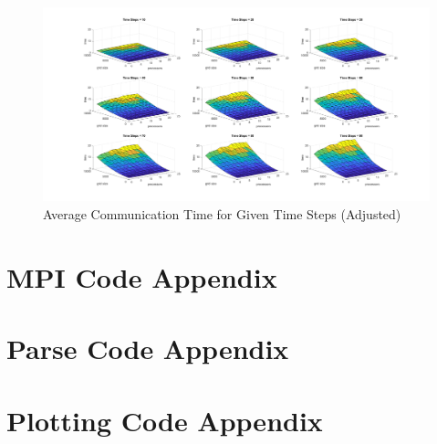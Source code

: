 \documentclass[a4paper, 11pt]{article}
\begin{document}
\begin{figure}[H]
	\centering
	\centerline{\includegraphics[width=7.5in]{comm_time_avg_scaled.png}}
	\caption{Average Communication Time for Given Time Steps (Adjusted)}
\end{figure}





\newpage
\section*{MPI Code Appendix}


\newpage
\section*{Parse Code Appendix}


\newpage
\section*{Plotting Code Appendix}

\end{document}
